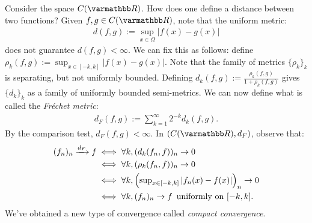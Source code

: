     \begin{example}
        Consider the space $C(\bfR)$. How does one define a distance between two functions? Given $f,g \in C(\bfR)$, note that the uniform metric:
            \begin{equation*}
            \begin{split}
                d(f,g) := \sup_{x \in \Omega}|f(x) - g(x)|
            \end{split}
            \end{equation*}
        does not guarantee $d(f,g) < \infty$. We can fix this as follows: define $\rho_k(f,g) := \sup_{x \in [-k,k]}|f(x) - g(x)|$. Note that the family of metrics $\{\rho_k\}_k$ is separating, but not uniformly bounded. Defining $d_k(f,g):= \frac{\rho_k(f,g)}{1 + \rho_k(f,g)}$ gives $\{d_k\}_k$ as a family of uniformly bounded semi-metrics. We can now define what is called the \textit{Fr\'echet metric}:
            \begin{equation*}
            \begin{split}
                d_F(f,g) := \sum_{k = 1}^\infty 2^{-k}d_k(f,g).
            \end{split}
            \end{equation*}
        By the comparison test, $d_F(f,g) < \infty$. In $(C(\bfR),d_F)$, observe that:
            \begin{equation*}
            \begin{split}
                (f_n)_n \xrightarrow{d_F}f 
                &\iff \forall k, (d_k(f_n,f))_n \rightarrow 0 \\
                &\iff \forall k, (\rho_k(f_n,f))_n \rightarrow 0 \\
                &\iff \forall k, \Bigl(\ts \sup_{x \in [-k,k]}|f_n(x) - f(x)|\Bigr)_n \rightarrow 0 \\
                &\iff \forall k, (f_n)_n \rightarrow f \h5\text{uniformly on $[-k,k]$}.
            \end{split}
            \end{equation*}
        We've obtained a new type of convergence called \textit{compact convergence}.
    \end{example}


    \iffalse
    \begin{center}
    \end{center}

